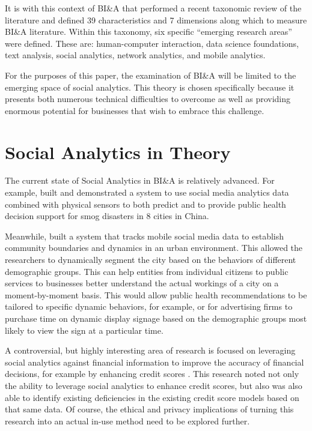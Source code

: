  It is with this context of BI\&A that \textcite{eggertFrontiersBusinessIntelligence2020} performed a recent taxonomic review of the literature and defined 39 characteristics and 7 dimensions along which to measure BI\&A literature. Within this taxonomy, six specific ``emerging research areas'' were defined. These are: human-computer interaction, data science foundations, text analysis, social analytics, network analytics, and mobile analytics.

 For the purposes of this paper, the examination of BI\&A will be limited to the emerging space of social analytics. This theory is chosen specifically because it presents both numerous technical difficulties to overcome as well as providing enormous potential for businesses that wish to embrace this challenge.

 \section{Social Analytics in Theory}

 The current state of Social Analytics in BI\&A is relatively advanced. For example, \textcite{chenForecastingSmogrelatedHealth2017} built and demonstrated a system to use social media analytics data combined with physical sensors to both predict and to provide public health decision support for smog disasters in 8 cities in China.

 Meanwhile, \textcite{gkatziakiDynamiCITYRevealingCity2017} built a system that tracks mobile social media data to establish community boundaries and dynamics in an urban environment. This allowed the researchers to dynamically segment the city based on the behaviors of different demographic groups. This can help entities from individual citizens to public services to businesses better understand the actual workings of a city on a moment-by-moment basis. This would allow public health recommendations to be tailored to specific dynamic behaviors, for example, or for advertising firms to purchase time on dynamic display signage based on the demographic groups most likely to view the sign at a particular time.

 A controversial, but highly interesting area of research is focused on leveraging social analytics against financial information to improve the accuracy of financial decisions, for example by enhancing credit scores \parencite{chaoApplicationSocialAnalytics2020}. This research noted not only the ability to leverage social analytics to enhance credit scores, but also was also able to identify existing deficiencies in the existing credit score models based on that same data. Of course, the ethical and privacy implications of turning this research into an actual in-use method need to be explored further.

